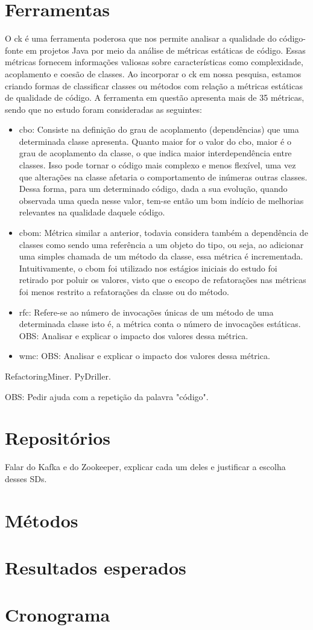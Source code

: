 \section{Ferramentas}\label{sec:ferramentas}
O \gls{ck} é uma ferramenta poderosa que nos permite analisar a qualidade do código-fonte em projetos Java por meio da análise de métricas estáticas de código. Essas métricas fornecem informações valiosas sobre características como complexidade, acoplamento e coesão de classes. Ao incorporar o \gls{ck} em nossa pesquisa, estamos criando formas de classificar classes ou métodos com relação a métricas estáticas de qualidade de código. A ferramenta em questão apresenta mais de 35 métricas, sendo que no estudo foram consideradas as seguintes:
\begin{itemize}
    \item \gls{cbo}: Consiste na definição do grau de acoplamento (dependências) que uma determinada classe apresenta. Quanto maior for o valor do \gls{cbo}, maior é o grau de acoplamento da classe, o que indica maior interdependência entre classes. Isso pode tornar o código mais complexo e menos flexível, uma vez que alterações na classe afetaria o comportamento de inúmeras outras classes. Dessa forma, para um determinado código, dada a sua evolução, quando observada uma queda nesse valor, tem-se então um bom indício de melhorias relevantes na qualidade daquele código.
    \item \gls{cbom}: Métrica similar a anterior, todavia considera também a dependência de classes como sendo uma referência a um objeto do tipo, ou seja, ao adicionar uma simples chamada de um método da classe, essa métrica é incrementada. Intuitivamente, o \gls{cbom} foi utilizado nos estágios iniciais do estudo foi retirado por poluir os valores, visto que o escopo de refatorações nas métricas foi menos restrito a refatorações da classe ou do método.
    \item \gls{rfc}: Refere-se ao número de invocações únicas de um método de uma determinada classe isto é, a métrica conta o número de invocações estáticas. 
    OBS: Analisar e explicar o impacto dos valores dessa métrica.
    \item \gls{wmc}: OBS: Analisar e explicar o impacto dos valores dessa métrica.
\end{itemize}

RefactoringMiner.
PyDriller.

OBS: Pedir ajuda com a repetição da palavra "código".

\section{Repositórios}\label{sec:repositorios}
Falar do Kafka e do Zookeeper, explicar cada um deles e justificar a escolha desses SDs.

\section{Métodos}\label{sec:metodo}

\section{Resultados esperados}


\section{Cronograma}